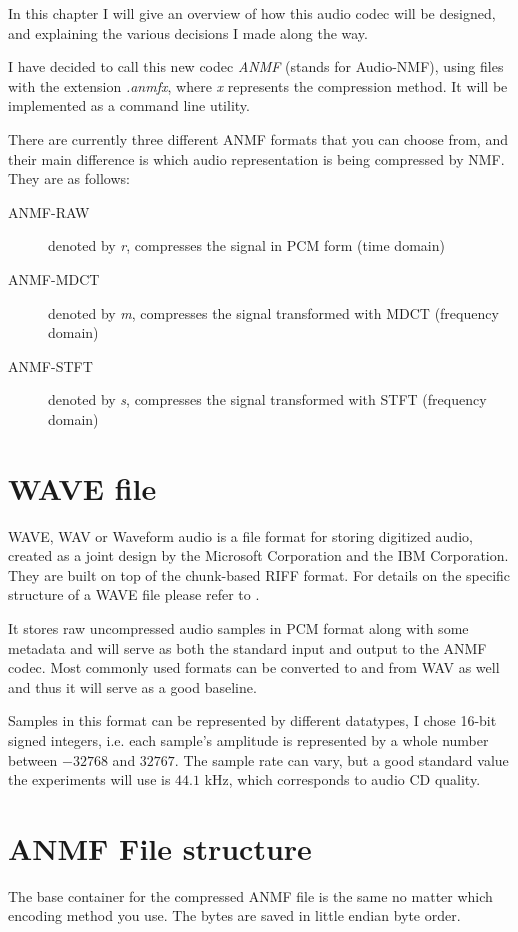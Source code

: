 In this chapter I will give an overview of how this audio codec will be designed, and explaining the various decisions I made along the way.

I have decided to call this new codec \emph{ANMF} (stands for Audio-NMF), using files with the extension \emph{.anmfx}, where \emph{x} represents the compression method. It will be implemented as a command line utility.

There are currently three different ANMF formats that you can choose from, and their main difference is which audio representation is being compressed by NMF. They are as follows:

\begin{description}
	\item[ANMF-RAW] denoted by \emph{r}, compresses the signal in PCM form (time domain)
	\item[ANMF-MDCT] denoted by \emph{m}, compresses the signal transformed with MDCT (frequency domain)
	\item[ANMF-STFT] denoted by \emph{s}, compresses the signal transformed with STFT (frequency domain)
\end{description}

\section{WAVE file}
WAVE, WAV or Waveform audio is a file format for storing digitized audio, created as a joint design by the Microsoft Corporation and the IBM Corporation. They are built on top of the chunk-based RIFF format. For details on the specific structure of a WAVE file please refer to \cite{sapp_pcm}.

It stores raw uncompressed audio samples in PCM format along with some metadata and will serve as both the standard input and output to the ANMF codec. Most commonly used formats can be converted to and from WAV as well and thus it will serve as a good baseline.

Samples in this format can be represented by different datatypes, I chose 16-bit signed integers, i.e. each sample's amplitude is represented by a whole number between $-32768$ and $32767$. The sample rate can vary, but a good standard value the experiments will use is $44.1$ kHz, which corresponds to audio CD quality.

\section {ANMF File structure}
The base container for the compressed ANMF file is the same no matter which encoding method you use. The bytes are saved in little endian byte order.

